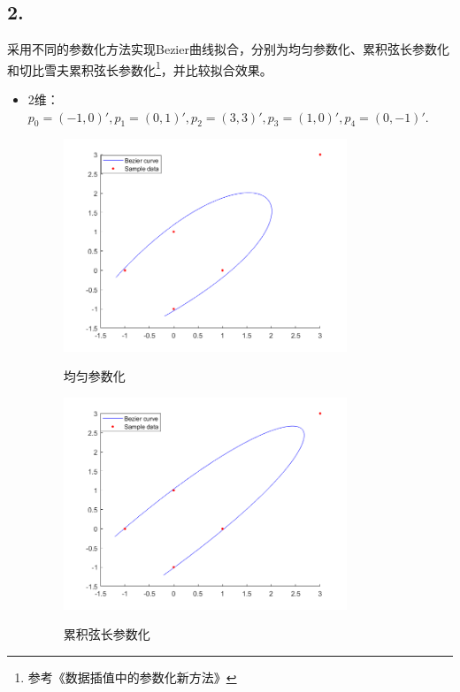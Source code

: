 \documentclass[utf8]{ctexart}
\begin{document}
\subsection*{2.}
采用不同的参数化方法实现Bezier曲线拟合，分别为均匀参数化、累积弦长参数化和切比雪夫累积弦长参数化\footnote{参考《数据插值中的参数化新方法》}，并比较拟合效果。
\begin{itemize}
    \item 2维：$p_0 = (-1,0)',
    p_1 = (0,1)',
    p_2 = (3,3)',
    p_3 = (1,0)',
    p_4 = (0,-1)'.$

    \begin{figure}[H]
        \centering
        \includegraphics[width=0.8\textwidth]{bezierFit_2d_uniform.png}
        \label{fig3}
        \caption{均匀参数化}
    \end{figure}
    \begin{figure}[H]
        \centering
        \includegraphics[width=0.8\textwidth]{bezierFit_2d_chord.png}
        \label{fig4}
        \caption{累积弦长参数化}
    \end{figure}

\end{itemize}
\end{document}
